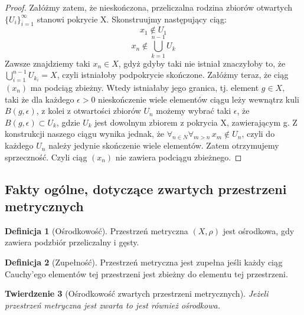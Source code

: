 \documentclass[licencjacka]{pwr_wmat_praca_dyplomowa}
\theoremstyle{plain}
\newtheorem{theorem}{Twierdzenie}
\numberwithin{theorem}{chapter}
\theoremstyle{definition}
\numberwithin{theorem}{chapter}
\newtheorem{definition}[theorem]{Definicja}
\begin{document}
\begin{proof}
Załóżmy zatem, że nieskończona, przeliczalna rodzina zbiorów otwartych $\{U_i\}_{i=1}^{\infty}$ stanowi pokrycie X. Skonstruujmy następujący ciąg: 
$$x_1 \notin U_1$$
$$x_n \notin \bigcup_{k=1}^{n-1} U_k$$ Zawsze znajdziemy taki $x_n \in X$, gdyż gdyby taki nie istniał znaczyłoby to, że $\bigcup_{i=1}^{n-1}{U_{k_i}} = X$, czyli istniałoby podpokrycie skończone. Załóżmy teraz, że ciąg $(x_n)$ ma podciąg zbieżny. Wtedy istniałaby jego granica, tj. element $g \in X,$ taki że dla każdego $\epsilon > 0$ nieskończenie wiele elementów ciągu leży wewnątrz kuli $B(g, \epsilon)$, z kolei z otwartości zbiorów $U_n$ możemy wybrać taki $\epsilon$, że $B(g, \epsilon) \subset U_k$, gdzie $U_k$ jest dowolnym zbiorem z pokrycia X, zawierającym g. Z konstrukcji naszego ciągu wynika jednak, że $\forall_{n \in N} \forall_{m>n} \, x_m \notin U_n$, czyli do każdego $U_n$ należy jedynie skończenie wiele elementów. Zatem otrzymujemy sprzeczność. Czyli ciąg $(x_n)$ nie zawiera podciągu zbieżnego.
\end{proof}


\subsection{Fakty ogólne, dotyczące zwartych przestrzeni metrycznych}


\begin{definition}[Ośrodkowość]
Przestrzeń metryczna $(X, \rho)$ jest ośrodkowa, gdy zawiera podzbiór przeliczalny i gęsty.
\end{definition}


\begin{definition}[Zupełność]
Przestrzeń metryczna jest zupełna jeśli każdy ciąg Cauchy'ego elementów tej przestrzeni jest zbieżny do elementu tej przestrzeni.
\end{definition}


\begin{theorem}[Ośrodkowość zwartych przestrzeni metrycznych] \label{zwarta_jest_osrodkowa}
Jeżeli przestrzeń metryczna jest zwarta to jest również ośrodkowa.
\end{theorem}
\end{document}
